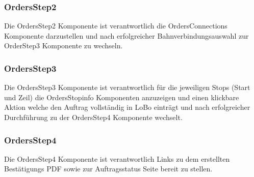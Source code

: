 \subsubsection{OrdersStep2}
Die OrdersStep2 Komponente ist verantwortlich die OrdersConnections Komponente darzustellen und nach erfolgreicher Bahnverbindungsauswahl zur OrderStep3 Komponente zu wechseln.

\subsubsection{OrdersStep3}
Die OrdersStep3 Komponente ist verantwortlich für die jeweiligen Stops (Start und Zeil) die OrdersStopinfo Komponenten anzuzeigen und einen klickbare Aktion welche den Auftrag vollständig in LoBo einträgt und nach erfolgreicher Durchführung zu der OrdersStep4 Komponente wechselt.

\subsubsection{OrdersStep4}
Die OrdersStep4 Komponente ist verantwortlich Links zu dem erstellten Bestätigungs PDF sowie zur Auftragsstatus Seite bereit zu stellen.








